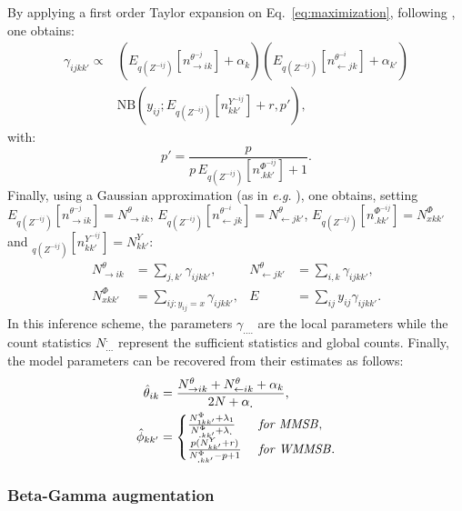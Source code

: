 By applying a first order Taylor expansion on Eq.~\eqref{eq:maximization}, following \cite{teh2007collapsed}, one obtains:
%
\begin{align*}
\gamma_{ijkk'} \propto & (E_{q({Z}^{-ij})}[n_{\rightarrow ik}^{\theta^{-j}}] + \alpha_k) (E_{q({Z}^{-ij})}[n_{\leftarrow jk}^{\theta^{-i}}] + \alpha_{k'}) \\
& \mathrm{NB}\left(y_{ij}; E_{q({Z}^{-ij})}[n^{{Y}^{-ij}}_{kk'}] + r,  p' \right),
\end{align*}
%
with:
%
\[
p' = \frac{p}{p\,E_{q({Z}^{-ij})}[n^{\Phi^{-ij}}_{\bm{.}kk'}] + 1}.
\]
%
Finally, using a Gaussian approximation (as in \textit{e.g.} \cite{asuncion2009smoothing}), one obtains, setting $E_{q({Z}^{-ij})}[n_{\rightarrow ik}^{\theta^{-j}}] = N^{\theta}_{\rightarrow ik}$, $E_{q({Z}^{-ij})}[n_{\leftarrow jk}^{\theta^{-i}}] = N^{\theta}_{\leftarrow jk'}$, $E_{q({Z}^{-ij})}[n^{\Phi^{-ij}}_{\bm{.}kk'}] = N^{\Phi}_{xkk'}$ and $_{q({Z}^{-ij})}[n^{{Y}^{-ij}}_{kk'}] = N^{{Y}}_{kk'}$:
%
\begin{align} \label{eq:sss}
   N^{\theta}_{\rightarrow ik} &= \sum_{j, k'} \gamma_{ijkk'},       & N^{\theta}_{\leftarrow jk'} &= \sum_{i, k} \gamma_{ijkk'},  \nonumber \\
   N^{\Phi}_{xkk'} &= \sum_{ij:y_{ij}=x} \gamma_{ijkk'},  & E &= \sum_{ij} y_{ij}\gamma_{ijkk'}.
\end{align}
%
In this inference scheme, the parameters $\gamma_{....}$ are the local parameters while the count statistics $N^{.}_{...}$ represent the sufficient statistics and global counts. Finally, the model parameters can be recovered from their estimates as follows:
%
\begin{align*}
\hat \theta_{ik} &= \frac{N^{\theta}_{\rightarrow ik} + N^{\theta}_{\leftarrow ik} + \alpha_k}{2N + \alpha_{\bm{.}}}, \\
\hat \phi_{kk'}&=\begin{cases}
     \frac{N^{\Phi}_{1 kk'} + \lambda_1}{N^{\Phi}_{\bm{.}kk'} + \lambda_{\bm{.}}} & \textrm{ \textit{for MMSB}}, \\
    \frac{p(N^{Y}_{kk'} + r)}{N^{\Phi}_{\bm{.}kk'} - p + 1}  & \textrm{ \textit{for WMMSB}}.  %
    \end{cases}
\end{align*}

\subsubsection{Beta-Gamma augmentation} 

